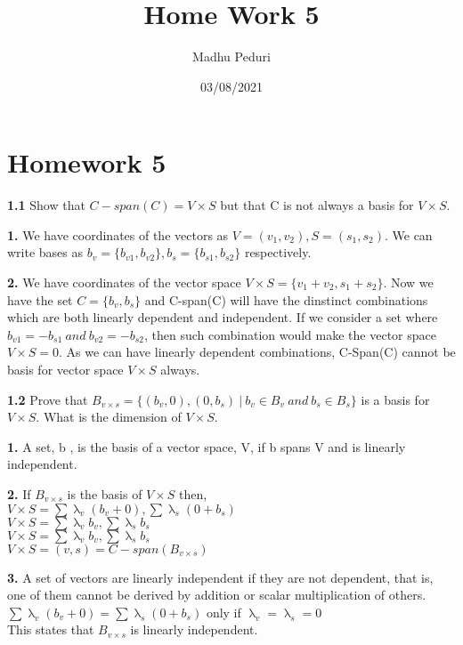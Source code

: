 \documentclass [12pt]{article}
\title{Home Work 5}
\author{Madhu Peduri}
\date{03/08/2021}
\theoremstyle{definition}
\begin{document}
\section*{Homework 5}

{\bf 1.1} Show that $C-span(C) = V \times S$ but that C is not always a basis for $V \times S$.

\phantom{1em} {\bf 1.} We have coordinates of the vectors as $V=(v_{1}, v_{2}), S=(s_{1}, s_{2})$.  We can write bases as $b_{v} =\{b_{v1},b_{v2}\}, b_{s}=\{b_{s1},b_{s2}\}$ respectively. 

\phantom{1em} {\bf 2.} We have coordinates of the vector space $V \times S = \{ v_{1} + v_{2},  s_{1} + s_{2}\}$. Now we have the set $C = \{b_{v}, b_{s} \}$ and C-span(C) will have the dinstinct combinations which are both linearly dependent and independent. If we consider a set where $b_{v1} = - b_{s1} \ and \ b_{v2} = - b_{s2}$, then such combination would make the vector space $V \times S = 0$. As we can have linearly dependent combinations, C-Span(C) cannot be basis for vector space $V \times S$ always. 

{\bf 1.2} Prove that $B_{v \times s} = \{(b_{v},0), (0,b_{s}) \ | \ b_{v} \in B_{v} \ and \ b_{s} \in B_{s} \}$ is a basis for $ V \times S$. What is the dimension of $V \times S$.

\phantom{1em} {\bf 1.} A set, b , is the basis of a vector space, V, if b spans V and is linearly independent. 

\phantom{1em} {\bf 2.} If $B_{v \times s}$ is the basis of $V \times S$ then, \\
\phantom{1000em} $V \times S = \sum \uplambda_{v}(b_{v} + 0),   \sum \uplambda_{s}(0 + b_{s})$\\
\phantom{1000em} $V \times S = \sum \uplambda_{v}b_{v},   \sum \uplambda_{s}b_{s}$\\
\phantom{1000em} $V \times S = \sum \uplambda_{v}b_{v},   \sum \uplambda_{s}b_{s}$\\
\phantom{1000em} $V \times S = (v,s) = C-span(B_{v \times s}) $

\phantom{1em} {\bf 3.} A set of vectors are linearly independent if they are not dependent, that is, one of  them cannot be derived by addition or scalar multiplication of others.\\
\phantom{1000em} $\sum \uplambda_{v}(b_{v} + 0) =   \sum \uplambda_{s}(0 + b_{s})$ only if $\uplambda_{v} = \uplambda_{s} = 0$\\
\phantom{1000em} This states that $B_{v \times s}$ is linearly independent.
\end{document}
